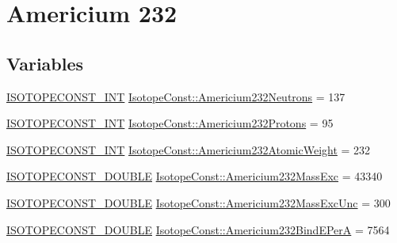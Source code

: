 \hypertarget{group___isotope_const-_americium-_am232}{}\section{Americium 232}
\label{group___isotope_const-_americium-_am232}
\subsection*{Variables}
\begin{DoxyCompactItemize}
\item 
\mbox{\hyperlink{group___isotope_const-_macros_ga5f18360b3e99483a35c32d789e62621c}{I\+S\+O\+T\+O\+P\+E\+C\+O\+N\+S\+T\+\_\+\+I\+NT}} \mbox{\hyperlink{group___isotope_const-_americium-_am232_gab68c0751c635ece77c61ba7cecbf0d46}{Isotope\+Const\+::\+Americium232\+Neutrons}} = 137
\item 
\mbox{\hyperlink{group___isotope_const-_macros_ga5f18360b3e99483a35c32d789e62621c}{I\+S\+O\+T\+O\+P\+E\+C\+O\+N\+S\+T\+\_\+\+I\+NT}} \mbox{\hyperlink{group___isotope_const-_americium-_am232_ga3189236d7f3775d11ef512e8a1848aef}{Isotope\+Const\+::\+Americium232\+Protons}} = 95
\item 
\mbox{\hyperlink{group___isotope_const-_macros_ga5f18360b3e99483a35c32d789e62621c}{I\+S\+O\+T\+O\+P\+E\+C\+O\+N\+S\+T\+\_\+\+I\+NT}} \mbox{\hyperlink{group___isotope_const-_americium-_am232_gaad69433565c916e8e92f40e0323d67fa}{Isotope\+Const\+::\+Americium232\+Atomic\+Weight}} = 232
\item 
\mbox{\hyperlink{group___isotope_const-_macros_ga8f45a7272ce02c0b4c65c44636ed719a}{I\+S\+O\+T\+O\+P\+E\+C\+O\+N\+S\+T\+\_\+\+D\+O\+U\+B\+LE}} \mbox{\hyperlink{group___isotope_const-_americium-_am232_ga2767e53c347eba748ebab382ad6fd44a}{Isotope\+Const\+::\+Americium232\+Mass\+Exc}} = 43340
\item 
\mbox{\hyperlink{group___isotope_const-_macros_ga8f45a7272ce02c0b4c65c44636ed719a}{I\+S\+O\+T\+O\+P\+E\+C\+O\+N\+S\+T\+\_\+\+D\+O\+U\+B\+LE}} \mbox{\hyperlink{group___isotope_const-_americium-_am232_ga4312dc62ecf3fe0fe38169406e9f5c02}{Isotope\+Const\+::\+Americium232\+Mass\+Exc\+Unc}} = 300
\item 
\mbox{\hyperlink{group___isotope_const-_macros_ga8f45a7272ce02c0b4c65c44636ed719a}{I\+S\+O\+T\+O\+P\+E\+C\+O\+N\+S\+T\+\_\+\+D\+O\+U\+B\+LE}} \mbox{\hyperlink{group___isotope_const-_americium-_am232_ga7dd3bb3b5e32251d280a056569ca798c}{Isotope\+Const\+::\+Americium232\+Bind\+E\+PerA}} = 7564
\item 

\end{DoxyCompactItemize}
